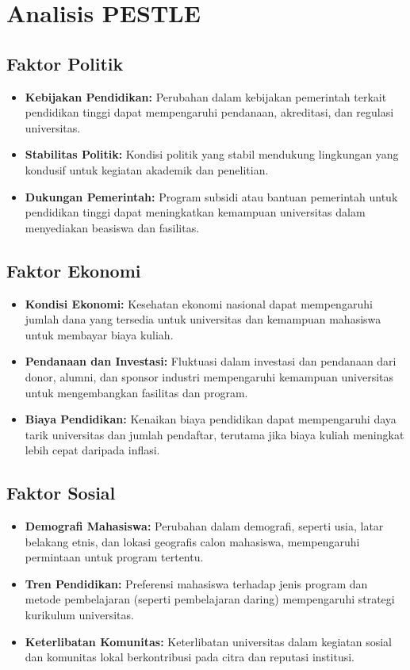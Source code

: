 \section{Analisis PESTLE}

\subsection{Faktor Politik}
\begin{itemize}
	\item \textbf{Kebijakan Pendidikan:} Perubahan dalam kebijakan pemerintah terkait pendidikan tinggi dapat mempengaruhi pendanaan, akreditasi, dan regulasi universitas.
	\item \textbf{Stabilitas Politik:} Kondisi politik yang stabil mendukung lingkungan yang kondusif untuk kegiatan akademik dan penelitian.
	\item \textbf{Dukungan Pemerintah:} Program subsidi atau bantuan pemerintah untuk pendidikan tinggi dapat meningkatkan kemampuan universitas dalam menyediakan beasiswa dan fasilitas.
\end{itemize}

\subsection{Faktor Ekonomi}
\begin{itemize}
	\item \textbf{Kondisi Ekonomi:} Kesehatan ekonomi nasional dapat mempengaruhi jumlah dana yang tersedia untuk universitas dan kemampuan mahasiswa untuk membayar biaya kuliah.
	\item \textbf{Pendanaan dan Investasi:} Fluktuasi dalam investasi dan pendanaan dari donor, alumni, dan sponsor industri mempengaruhi kemampuan universitas untuk mengembangkan fasilitas dan program.
	\item \textbf{Biaya Pendidikan:} Kenaikan biaya pendidikan dapat mempengaruhi daya tarik universitas dan jumlah pendaftar, terutama jika biaya kuliah meningkat lebih cepat daripada inflasi.
\end{itemize}

\subsection{Faktor Sosial}
\begin{itemize}
	\item \textbf{Demografi Mahasiswa:} Perubahan dalam demografi, seperti usia, latar belakang etnis, dan lokasi geografis calon mahasiswa, mempengaruhi permintaan untuk program tertentu.
	\item \textbf{Tren Pendidikan:} Preferensi mahasiswa terhadap jenis program dan metode pembelajaran (seperti pembelajaran daring) mempengaruhi strategi kurikulum universitas.
	\item \textbf{Keterlibatan Komunitas:} Keterlibatan universitas dalam kegiatan sosial dan komunitas lokal berkontribusi pada citra dan reputasi institusi.
\end{itemize}

